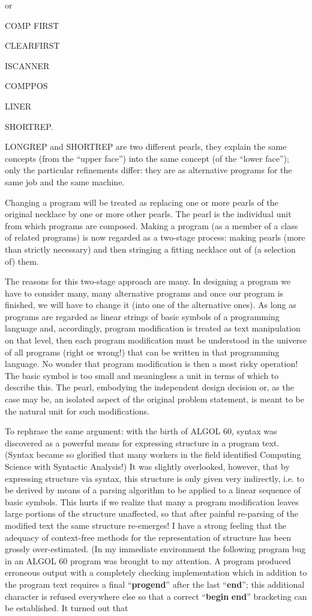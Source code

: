 \documentclass[twoside,11pt]{book}
\begin{document}
\noindent
or

COMP FIRST

CLEARFIRST

ISCANNER

COMPPOS

LINER

SHORTREP.

LONGREP and SHORTREP are two different pearls, they explain the same concepts (from the ``upper face'') into the same concept (of the ``lower face''); only the particular refinements differ: they are as alternative programs for the same job and the same machine.

Changing a program will be treated as replacing one or more pearls of the original necklace by one or more other pearls. The pearl is the individual unit from which programs are composed. Making a program (as a member of a class of related programs) is now regarded as a two-stage process: making pearls (more than strictly necessary) and then stringing a fitting necklace out of (a selection of) them.

The reasons for this two-stage approach are many. In designing a program we have to consider many, many alternative programs and once our program is finished, we will have to change it (into one of the alternative ones). As long as programs are regarded as linear strings of basic symbols of a programming language and, accordingly, program modification is treated as text manipulation on that level, then each program modification must be understood in the universe of all programs (right or wrong!) that can be written in that programming language. No wonder that program modification is then a most risky operation! The basic symbol is too small and meaningless a unit in terms of which to describe this. The pearl, embodying the independent design decision or, as the case may be, an isolated aspect of the original problem statement, is meant to be the natural unit for such modifications.

To rephrase the same argument: with the birth of ALGOL 60, syntax was discovered as a powerful means for expressing structure in a program text. (Syntax became so glorified that many workers in the field identified Computing Science with Syntactic Analysis!) It was slightly overlooked, however, that by expressing structure via syntax, this structure is only given very indirectly, i.e. to be derived by means of a parsing algorithm to be applied to a linear sequence of basic symbols. This hurts if we realize that many a program modification leaves large portions of the structure unaffected, so that after painful re-parsing of the modified text the same structure re-emerges! I have a strong feeling that the adequacy of context-free methods for the representation of structure has been grossly over-estimated. (In my immediate environment the following program bug in an ALGOL 60 program was brought to my attention. A program produced erroneous output with a completely checking implementation which in addition to the program text requires a final ``\textbf{progend}'' after the last ``\textbf{end}''; this additional character is refused everywhere else so that a correct ``\textbf{begin} \textendash  \textbf{end}'' bracketing can be established. It turned out that
\end{document}
